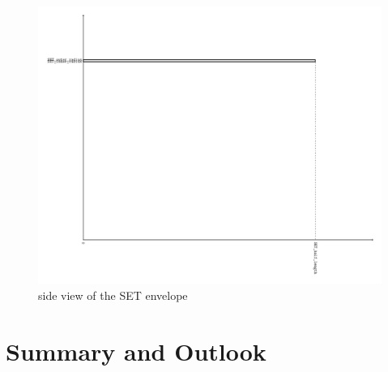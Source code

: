 \documentclass[a4paper]{article}
\begin{document}
\begin{figure}[th]
  \centering
  \includegraphics[width=1.3\columnwidth]{SET_rz_envelope}
  \caption{side view of the SET envelope}
  \label{ild:fig:set_env_rz}
\end{figure}


\section{Summary and Outlook}





%
%
\end{document}
